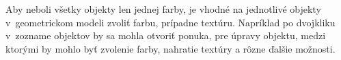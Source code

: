Aby neboli všetky objekty len jednej farby, je vhodné na jednotlivé objekty v~geometrickom modeli zvoliť farbu, prípadne textúru. Napríklad po dvojkliku v~zozname objektov by sa mohla otvoriť ponuka, pre úpravy objektu, medzi ktorými by mohlo byť zvolenie farby, nahratie textúry a rôzne ďalšie možnosti.
